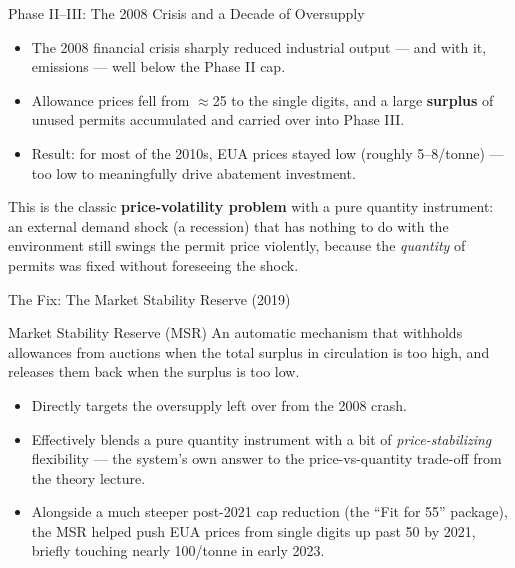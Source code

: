 \documentclass[11pt,aspectratio=169]{beamer}
\begin{document}
\begin{frame}{Phase II--III: The 2008 Crisis and a Decade of Oversupply}
  \begin{itemize}
    \item The 2008 financial crisis sharply reduced industrial output --- and with it, emissions --- well below the Phase II cap.
    \item Allowance prices fell from $\approx$\texteuro{}25 to the single digits, and a large \textbf{surplus} of unused permits accumulated and carried over into Phase III.
    \item Result: for most of the 2010s, EUA prices stayed low (roughly \texteuro{}5--8/tonne) --- too low to meaningfully drive abatement investment.
  \end{itemize}
  \small This is the classic \textbf{price-volatility problem} with a pure quantity instrument: an external demand shock (a recession) that has nothing to do with the environment still swings the permit price violently, because the \emph{quantity} of permits was fixed without foreseeing the shock.
\end{frame}

\begin{frame}{The Fix: The Market Stability Reserve (2019)}
  \begin{block}{Market Stability Reserve (MSR)}
    An automatic mechanism that withholds allowances from auctions when the total surplus in circulation is too high, and releases them back when the surplus is too low.
  \end{block}
  \begin{itemize}
    \item Directly targets the oversupply left over from the 2008 crash.
    \item Effectively blends a pure quantity instrument with a bit of \emph{price-stabilizing} flexibility --- the system's own answer to the price-vs-quantity trade-off from the theory lecture.
    \item Alongside a much steeper post-2021 cap reduction (the ``Fit for 55'' package), the MSR helped push EUA prices from single digits up past \texteuro{}50 by 2021, briefly touching nearly \texteuro{}100/tonne in early 2023.
  \end{itemize}
\end{frame}
\end{document}

